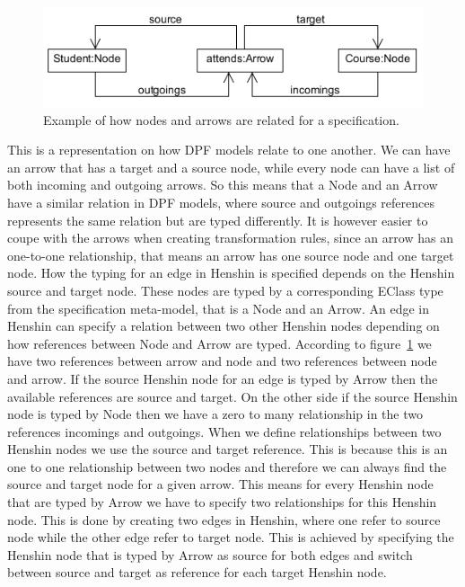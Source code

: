 \begin{figure}[H] 
	\centering
	\includegraphics[scale=0.8]{./Figures/arrow_node_relate.png}
	\caption[Relationship between node and arrow in DPF]
	{Example of how nodes and arrows are related for a specification.}
	\label{fig:arrow_node_relate}
\end{figure}

This is a representation on how DPF models relate to one another. We can have an
arrow that has a target and a source node, while every node can have a list of
both incoming and outgoing arrows. So this means that a Node and an Arrow have a
similar relation in DPF models, where source and outgoings references represents
the same relation but are typed differently. It is however easier to coupe with
the arrows when creating transformation rules, since an arrow has an
one-to-one relationship, that means an arrow has one source node and one
target node. How the typing for an edge in Henshin is specified depends on the
Henshin source and target node. These nodes are typed by a corresponding EClass
type from the specification meta-model, that is a Node and an Arrow. An edge in
Henshin can specify a relation between two other Henshin
nodes depending on how references between Node and Arrow are typed. According to
figure~\ref{fig:arrow_node_relate} we have two references between arrow and
node and two references between node and arrow. If the source Henshin node for
an edge is typed by Arrow then the available references are source and target.
On the other side if the source Henshin node is typed by Node then we have a
zero to many relationship in the two references incomings and outgoings. When we
define relationships between two Henshin nodes we use the source and target
reference. This is because this is an one to one relationship between two nodes
and therefore we can always find the source and target node for a given arrow.
This means for every Henshin node that are typed by Arrow we have to specify two
relationships for this Henshin node. This is done by creating two edges in
Henshin, where one refer to source node while the other edge refer to
target node. This is achieved by specifying the Henshin node that is typed by
Arrow as source for both edges and switch between source and target as reference
for each target Henshin node. 


